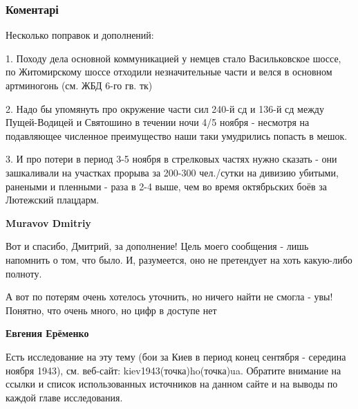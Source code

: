  
 
 
 
 
\subsubsection{Коментарі}
\label{sec:05_11_2021.fb.fb_group.story_kiev_ua.5.svjatoshino_1943_osvobozhdenie.cmt}

\begin{itemize} %

Несколько поправок и дополнений:

1. Походу дела основной коммуникацией у немцев стало Васильковское шоссе, по
Житомирскому шоссе отходили незначительные части и велся в основном артминогонь
(см. ЖБД 6-го гв. тк)

2. Надо бы упомянуть про окружение части сил 240-й сд и 136-й сд между
Пущей-Водицей и Святошино в течении ночи 4/5 ноября - несмотря на подавляющее
численное преимущество наши таки умудрились попасть в мешок.

3. И про потери в период 3-5 ноября в стрелковых частях нужно сказать - они
зашкаливали на участках прорыва за 200-300 чел./сутки на дивизию убитыми,
ранеными и пленными - раза в 2-4 выше, чем во время октябрьских боёв за
Лютежский плацдарм.

\begin{itemize} %
\textbf{Muravov Dmitriy} 

Вот и спасибо, Дмитрий, за дополнение! Цель моего сообщения - лишь напомнить о
том, что было. И, разумеется, оно не претендует на хоть какую-либо полноту.

А вот по потерям очень хотелось уточнить, но ничего найти не смогла - увы!
Понятно, что очень много, но цифр в доступе нет

\begin{itemize} %
\textbf{Евгения Ерёменко} 

Есть исследование на эту тему (бои за Киев в период конец сентября - середина
ноября 1943), см. веб-сайт: kiev1943(точка)ho(точка)ua. Обратите внимание на
ссылки и список использованных источников на данном сайте и на выводы по каждой
главе исследования.


\end{itemize}
\end{itemize}
\end{itemize}
